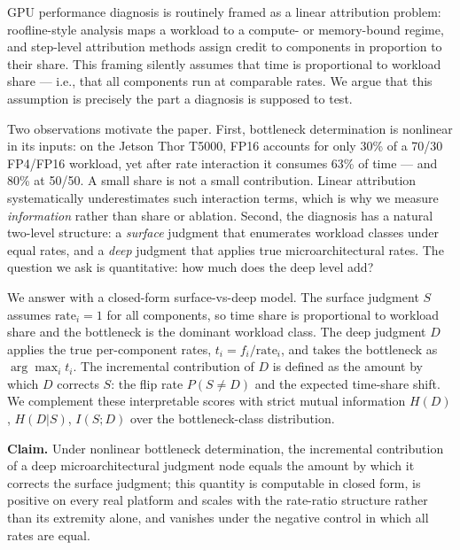 \documentclass[11pt]{article}
\begin{document}
GPU performance diagnosis is routinely framed as a linear attribution problem: roofline-style analysis maps a workload to a compute- or memory-bound regime, and step-level attribution methods assign credit to components in proportion to their share. This framing silently assumes that time is proportional to workload share --- i.e., that all components run at comparable rates. We argue that this assumption is precisely the part a diagnosis is supposed to test.

Two observations motivate the paper. First, bottleneck determination is nonlinear in its inputs: on the Jetson Thor T5000, FP16 accounts for only 30\% of a 70/30 FP4/FP16 workload, yet after rate interaction it consumes 63\% of time --- and 80\% at 50/50. A small share is not a small contribution. Linear attribution systematically underestimates such interaction terms, which is why we measure \emph{information} rather than share or ablation. Second, the diagnosis has a natural two-level structure: a \emph{surface} judgment that enumerates workload classes under equal rates, and a \emph{deep} judgment that applies true microarchitectural rates. The question we ask is quantitative: how much does the deep level add?

We answer with a closed-form surface-vs-deep model. The surface judgment \(S\) assumes \(\text{rate}_i = 1\) for all components, so time share is proportional to workload share and the bottleneck is the dominant workload class. The deep judgment \(D\) applies the true per-component rates, \(t_i = f_i / \text{rate}_i\), and takes the bottleneck as \(\arg\max_i t_i\). The incremental contribution of \(D\) is defined as the amount by which \(D\) corrects \(S\): the flip rate \(P(S \neq D)\) and the expected time-share shift. We complement these interpretable scores with strict mutual information \(H(D)\), \(H(D|S)\), \(I(S;D)\) over the bottleneck-class distribution.

\textbf{Claim.} Under nonlinear bottleneck determination, the incremental contribution of a deep microarchitectural judgment node equals the amount by which it corrects the surface judgment; this quantity is computable in closed form, is positive on every real platform and scales with the rate-ratio structure rather than its extremity alone, and vanishes under the negative control in which all rates are equal.
\end{document}
